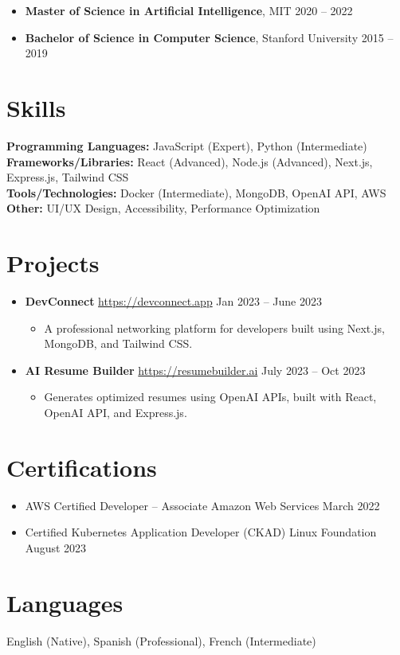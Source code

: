 \documentclass{article}
\begin{document}
\begin{itemize}
    \item \textbf{Master of Science in Artificial Intelligence}, MIT \hfill 2020 -- 2022
    \item \textbf{Bachelor of Science in Computer Science}, Stanford University \hfill 2015 -- 2019
\end{itemize}

\section*{Skills}

\textbf{Programming Languages:} JavaScript (Expert), Python (Intermediate) \\
\textbf{Frameworks/Libraries:} React (Advanced), Node.js (Advanced), Next.js, Express.js, Tailwind CSS \\
\textbf{Tools/Technologies:} Docker (Intermediate), MongoDB, OpenAI API, AWS \\
\textbf{Other:} UI/UX Design,  Accessibility, Performance Optimization

\section*{Projects}

\begin{itemize}
    \item \textbf{DevConnect} \hfill \href{https://devconnect.app}{https://devconnect.app} \hfill Jan 2023 -- June 2023
    \begin{itemize}
        \item A professional networking platform for developers built using Next.js, MongoDB, and Tailwind CSS.
    \end{itemize}
    \item \textbf{AI Resume Builder} \hfill \href{https://resumebuilder.ai}{https://resumebuilder.ai} \hfill July 2023 -- Oct 2023
    \begin{itemize}
        \item Generates optimized resumes using OpenAI APIs, built with React, OpenAI API, and Express.js.
    \end{itemize}
\end{itemize}

\section*{Certifications}

\begin{itemize}
    \item AWS Certified Developer – Associate \hfill Amazon Web Services \hfill March 2022
    \item Certified Kubernetes Application Developer (CKAD) \hfill Linux Foundation \hfill August 2023
\end{itemize}

\section*{Languages}

English (Native), Spanish (Professional), French (Intermediate)
\end{document}
